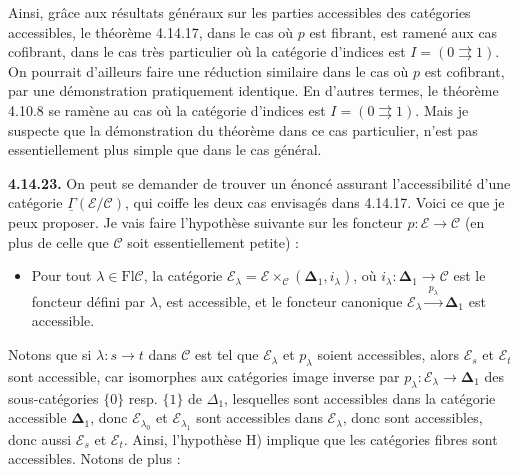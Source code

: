 \documentclass[11pt]{article}
\newcommand{\printedpage}[1]{\marginpar{\footnotesize p.~#1}}
\newcommand{\msp}[1]{\marginpar{\footnotesize [#1]}}
\newcommand{\uGamma}{\underline{\Gamma}}
\newcommand{\bDelta}{\boldsymbol{\Delta}}
\newcommand{\Fl}{\mathrm{Fl}}
\begin{document}
Ainsi, grâce aux résultats généraux sur les parties accessibles des catégories accessibles, le théorème 4.14.17, dans le cas où $p$ est fibrant, est ramené aux cas cofibrant, dans le cas très particulier où la catégorie d'indices est $I=(0\rightrightarrows 1)$. On pourrait d'ailleurs faire une réduction similaire dans le cas où $p$ est cofibrant, par une démonstration pratiquement %
\printedpage{155}
identique. En d'autres termes, le théorème 4.10.8 se ramène au cas où la catégorie d'indices est $I=(0\rightrightarrows 1)$. Mais je suspecte que la démonstration du théorème dans ce cas particulier, n'est pas essentiellement plus simple que dans le cas général.

\msp{page 409}

\textbf{4.14.23.} On peut se demander de trouver un énoncé assurant l'accessibilité d'une catégorie $\uGamma(\mathcal{E}/\mathcal{C})$, qui coiffe les deux cas envisagés dans 4.14.17. Voici ce que je peux proposer. Je vais faire l'hypothèse suivante sur les foncteur $p:\mathcal{E}\longrightarrow\mathcal{C}$ (en plus de celle que $\mathcal{C}$ soit essentiellement petite) : %

\begin{itemize}[leftmargin=*]
\item[H)] Pour tout $\lambda\in\Fl\mathcal{C}$, la catégorie $\mathcal{E}_\lambda=\mathcal{E}\times_{\mathcal{C}}(\bDelta_1,i_\lambda)$, où $i_\lambda:\bDelta_1\longrightarrow\mathcal{C}$ est le foncteur défini par $\lambda$, est accessible, et le foncteur canonique $\mathcal{E}_\lambda\xrightarrow{\;p_\lambda\;}\bDelta_1$ est accessible.
\end{itemize}

Notons que si $\lambda:s\longrightarrow t$ dans $\mathcal{C}$ est tel que $\mathcal{E}_\lambda$ et $p_\lambda$ soient accessibles, alors $\mathcal{E}_s$ et $\mathcal{E}_t$ sont accessible, car isomorphes aux catégories image inverse par $p_\lambda:\mathcal{E}_\lambda\longrightarrow\bDelta_1$ des sous-catégories $\{0\}$ resp. $\{1\}$ de $\Delta_1$, lesquelles sont accessibles dans la catégorie accessible $\bDelta_1$, donc %
\msp{page 410}
$\mathcal{E}_{\lambda_0}$ et $\mathcal{E}_{\lambda_1}$ sont accessibles dans $\mathcal{E}_\lambda$, donc sont accessibles, donc aussi $\mathcal{E}_s$ et $\mathcal{E}_t$. Ainsi, l'hypothèse H) implique que les catégories fibres sont accessibles. Notons de plus :
\end{document}
